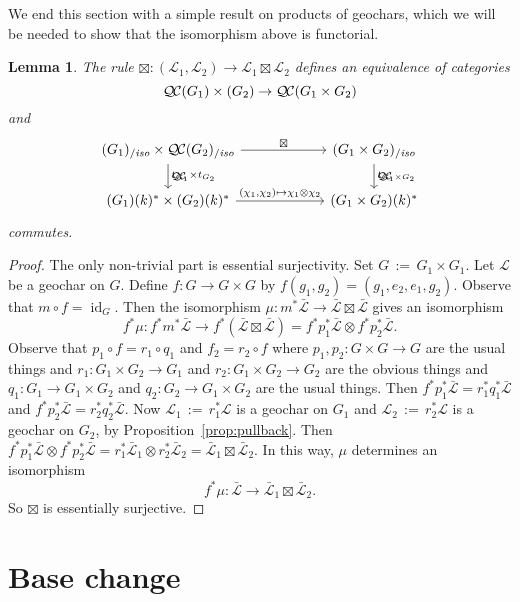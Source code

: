 \documentclass[11pt]{amsart}
\theoremstyle{plain}
\newtheorem{lemma}[theorem]{Lemma}
\theoremstyle{definition}
\theoremstyle{remark}
\newcommand{\Fq}{k}
\DeclareMathOperator{\id}{id}
\newcommand{\ceq}{{\, :=\, }}
\newcommand{\cs}[1]{{\mathcal{#1}}}
\newcommand{\gcs}[1]{{\mathcal{\bar #1}}}
\newcommand{\QC}{{\mathcal{Q\hskip-0.8pt C}}}
\newcommand{\QCiso}[1]{\QC(#1)_{/\textit{iso}}}
\begin{document}
We end this section with a simple result on products of geochars, which we will be needed to show that the isomorphism above is functorial.

\begin{lemma}\label{lemma:product}
The rule $\boxtimes : (\cs{L}_1,\cs{L}_2)\to \cs{L}_1\boxtimes\cs{L}_2$ defines an equivalence of categories 
\[
\QC(G_1)\times(G_2) \to \QC(G_1\times G_2)
\]
and 
\[
\begin{tikzcd}[column sep=60]
\arrow{d}{t_{G_1} \times t_{G_2}} \QCiso{G_1}\times \QCiso{G_2} \arrow{r}{\boxtimes} & \arrow{d}{t_{G_1\times G_2}} \QCiso{G_1\times G_2}\\
(G_1)(\Fq)^*\times (G_2)(\Fq)^* \arrow{r}{(\chi_1,\chi_2)\mapsto \chi_1\otimes \chi_2}  & (G_1\times G_2)(\Fq)^*
\end{tikzcd}
\]
commutes.
\end{lemma}

\begin{proof}
The only non-trivial part is essential surjectivity. Set $G \ceq G_1\times G_1$. Let $\cs{L}$ be a geochar on $G$. Define $f : G\to G\times G$ by $f(g_1,g_2) = (g_1,e_2,e_1,g_2)$. Observe that $m\circ f = \id_G$. 
Then the isomorphism $\mu : m^* \gcs{L} \to \gcs{L}\boxtimes \gcs{L}$ gives an isomorphism
\[
f^*\mu : f^* m^* \gcs{L} \to f^*(\gcs{L}\boxtimes \gcs{L}) = f^*p_1^*\gcs{L}\otimes f^* p_2^*\gcs{L}.
\]
Observe that $p_1\circ f = r_1 \circ q_1$ and $f_2 = r_2\circ f$ where $p_1 , p_2 : G\times G \to G$ are the usual things and $r_1 : G_1\times G_2 \to G_1$ and $r_2 : G_1\times G_2 \to G_2$ are the obvious things and $q_1 : G_1\to G_1\times G_2$ and  $q_2 : G_2\to G_1\times G_2$ are the usual things. Then $f^*p_1^*\gcs{L} = r_1^* q_1^* \gcs{L}$ and $f^*p_2^*\gcs{L} = r_2^* q_2^* \gcs{L}$. Now $\cs{L}_1 \ceq r_1^* \cs{L}$ is a geochar on $G_1$ and $\cs{L}_2 \ceq r_2^* \cs{L}$ is a geochar on $G_2$, by Proposition~\ref{prop:pullback}. Then
$ f^*p_1^*\gcs{L}\otimes f^* p_2^*\gcs{L} = r_1^*\gcs{L}_1\otimes r_2^* \gcs{L}_2 = \gcs{L}_1\boxtimes \gcs{L}_2$. In this way, $\mu$ determines an isomorphism
\[
f^*\mu : \gcs{L} \to  \gcs{L}_1\boxtimes \gcs{L}_2.
\]
So $\boxtimes$ is essentially surjective.
\end{proof}

\section{Base change}\label{sec:basechange}
\end{document}
